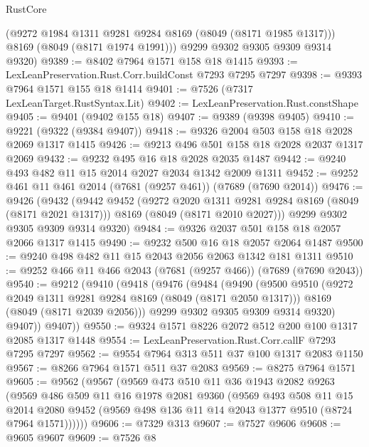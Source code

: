 \begin{lexlean}{RustCore}
\begin{coremodule}
        (@9272 @1984 @1311 @9281 @9284 @8169 (@8049 (@8171 @1985 @1317)))
        @8169
        (@8049 (@8171 @1974 @1991)))
      @9299
      @9302
      @9305
      @9309
      @9314
      @9320)
@9389 := @8402 @7964 @1571 @158 @18 @1415
@9393 := LexLeanPreservation.Rust.Corr.buildConst @7293 @7295 @7297
@9398 := @9393 @7964 @1571 @155 @18 @1414
@9401 := @7526 (@7317 LexLeanTarget.RustSyntax.Lit)
@9402 := LexLeanPreservation.Rust.constShape
@9405 := @9401 (@9402 @155 @18)
@9407 := @9389 (@9398 @9405)
@9410 := @9221 (@9322 (@9384 @9407))
@9418 := @9326 @2004 @503 @158 @18 @2028 @2069 @1317 @1415
@9426 := @9213 @496 @501 @158 @18 @2028 @2037 @1317 @2069
@9432 := @9232 @495 @16 @18 @2028 @2035 @1487
@9442 := @9240 @493 @482 @11 @15 @2014 @2027 @2034 @1342 @2009 @1311
@9452 := @9252 @461 @11 @461 @2014 (@7681 (@9257 @461)) (@7689 (@7690 @2014))
@9476 := @9426
    (@9432
      (@9442
        @9452
        (@9272 @2020 @1311 @9281 @9284 @8169 (@8049 (@8171 @2021 @1317)))
        @8169
        (@8049 (@8171 @2010 @2027)))
      @9299
      @9302
      @9305
      @9309
      @9314
      @9320)
@9484 := @9326 @2037 @501 @158 @18 @2057 @2066 @1317 @1415
@9490 := @9232 @500 @16 @18 @2057 @2064 @1487
@9500 := @9240 @498 @482 @11 @15 @2043 @2056 @2063 @1342 @181 @1311
@9510 := @9252 @466 @11 @466 @2043 (@7681 (@9257 @466)) (@7689 (@7690 @2043))
@9540 := @9212
    (@9410
      (@9418
        (@9476
          (@9484
            (@9490
              (@9500
                @9510
                (@9272 @2049 @1311 @9281 @9284 @8169 (@8049 (@8171 @2050 @1317)))
                @8169
                (@8049 (@8171 @2039 @2056)))
              @9299
              @9302
              @9305
              @9309
              @9314
              @9320)
            @9407))
        @9407))
@9550 := @9324 @1571 @8226 @2072 @512 @200 @100 @1317 @2085 @1317 @1448
@9554 := LexLeanPreservation.Rust.Corr.callF @7293 @7295 @7297
@9562 := @9554 @7964 @313 @511 @37 @100 @1317 @2083 @1150
@9567 := @8266 @7964 @1571 @511 @37 @2083
@9569 := @8275 @7964 @1571
@9605 := @9562
    (@9567
      (@9569
        @473
        @510
        @11
        @36
        @1943
        @2082
        @9263
        (@9569
          @486
          @509
          @11
          @16
          @1978
          @2081
          @9360
          (@9569
            @493
            @508
            @11
            @15
            @2014
            @2080
            @9452
            (@9569 @498 @136 @11 @14 @2043 @1377 @9510 (@8724 @7964 @1571))))))
@9606 := @7329 @313
@9607 := @7527 @9606
@9608 := @9605 @9607
@9609 := @7526 @8

\end{coremodule}
\end{lexlean}

